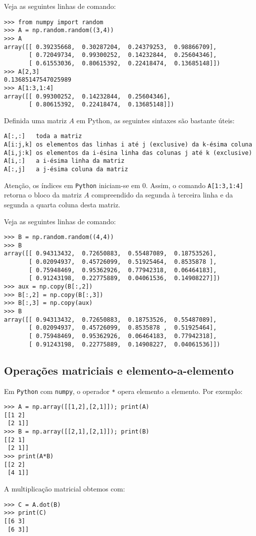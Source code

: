 \begin{ex}
  Veja as seguintes linhas de comando:
\begin{verbatim}
>>> from numpy import random
>>> A = np.random.random((3,4))
>>> A
array([[ 0.39235668,  0.30287204,  0.24379253,  0.98866709],
       [ 0.72049734,  0.99300252,  0.14232844,  0.25604346],
       [ 0.61553036,  0.80615392,  0.22418474,  0.13685148]])
>>> A[2,3]
0.13685147547025989
>>> A[1:3,1:4]
array([[ 0.99300252,  0.14232844,  0.25604346],
       [ 0.80615392,  0.22418474,  0.13685148]])
\end{verbatim}
\end{ex}

Definida uma matriz $A$ em Python, as seguintes sintaxes são bastante úteis:
\begin{verbatim}
A[:,:]   toda a matriz
A[i:j,k] os elementos das linhas i até j (exclusive) da k-ésima coluna
A[i,j:k] os elementos da i-ésina linha das colunas j até k (exclusive)
A[i,:]   a i-ésima linha da matriz
A[:,j]   a j-ésima coluna da matriz
\end{verbatim}

Atenção, os índices em \verb+Python+ iniciam-se em $0$. Assim, o comando \verb+A[1:3,1:4]+ retorna o bloco da matriz $A$ compreendido da segunda à terceira linha e da segunda a quarta coluna desta matriz. 

\begin{ex}
Veja as seguintes linhas de comando:
\begin{verbatim}
>>> B = np.random.random((4,4))
>>> B
array([[ 0.94313432,  0.72650883,  0.55487089,  0.18753526],
       [ 0.02094937,  0.45726099,  0.51925464,  0.8535878 ],
       [ 0.75948469,  0.95362926,  0.77942318,  0.06464183],
       [ 0.91243198,  0.22775889,  0.04061536,  0.14908227]])
>>> aux = np.copy(B[:,2])
>>> B[:,2] = np.copy(B[:,3])
>>> B[:,3] = np.copy(aux)
>>> B
array([[ 0.94313432,  0.72650883,  0.18753526,  0.55487089],
       [ 0.02094937,  0.45726099,  0.8535878 ,  0.51925464],
       [ 0.75948469,  0.95362926,  0.06464183,  0.77942318],
       [ 0.91243198,  0.22775889,  0.14908227,  0.04061536]])
\end{verbatim}
\end{ex}

\subsection{Operações matriciais e elemento-a-elemento}

Em \verb+Python+ com \verb+numpy+, o operador \verb+*+ opera elemento a elemento. Por exemplo:
\begin{verbatim}
>>> A = np.array([[1,2],[2,1]]); print(A)
[[1 2]
 [2 1]]
>>> B = np.array([[2,1],[2,1]]); print(B)
[[2 1]
 [2 1]]
>>> print(A*B)
[[2 2]
 [4 1]]
\end{verbatim}
A multiplicação matricial obtemos com:
\begin{verbatim}
>>> C = A.dot(B)
>>> print(C)
[[6 3]
 [6 3]]
\end{verbatim}

